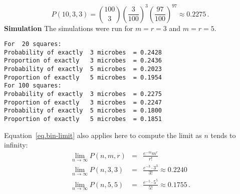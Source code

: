 \[
P(10,3,3) = {100 \choose 3} \left(\frac{3}{100}\right)^3 \left(\frac{97}{100}\right)^{97}\approx 0.2275\,.
\]
\textbf{Simulation}
The simulations were run for $m=r=3$ and $m=r=5$.
\begin{verbatim}
For  20 squares:
Probability of exactly  3 microbes  = 0.2428
Proportion of exactly   3 microbes  = 0.2436
Probability of exactly  5 microbes  = 0.2023
Proportion of exactly   5 microbes  = 0.1954
For 100 squares:
Probability of exactly  3 microbes  = 0.2275
Proportion of exactly   3 microbes  = 0.2247
Probability of exactly  5 microbes  = 0.1800
Proportion of exactly   5 microbes  = 0.1851
\end{verbatim}

Equation~\ref{eq.bin-limit} also applies here to compute the limit as $n$ tends to infinity:
\begin{eqnarray*}
\lim_{n\rightarrow \infty}P(n,m,r) &=& \frac{e^{-m}m^r}{r!}\\
\lim_{n\rightarrow \infty} P(n,3,3) &=& \frac{e^{-3}\cdot 3^3}{3!}\approx 0.2240\\
\lim_{n\rightarrow \infty} P(n,5,5) &=& \frac{e^{-5}\cdot 5^5}{5!}\approx 0.1755\,.
\end{eqnarray*}



